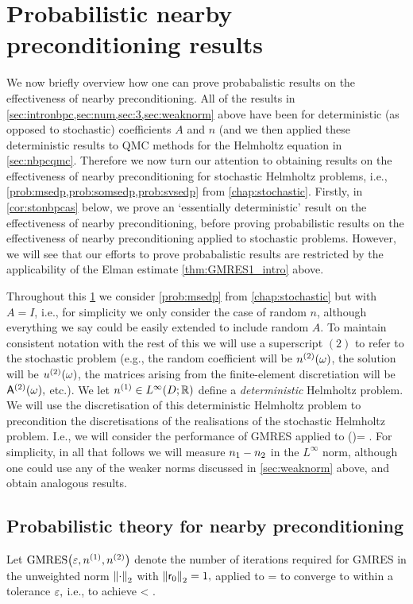 \section{Probabilistic nearby preconditioning results}\label{sec:nbpcstochastic}

We now briefly overview how one can prove probabalistic results on the effectiveness of nearby preconditioning. All of the results in \cref{sec:intronbpc,sec:num,sec:3,sec:weaknorm} above have been for deterministic (as opposed to stochastic) coefficients $A$ and $n$ (and we then applied these deterministic results to QMC methods for the Helmholtz equation in \cref{sec:nbpcqmc}. Therefore we now turn our attention to obtaining results on the effectiveness of nearby preconditioning for stochastic Helmholtz problems, i.e., \cref{prob:msedp,prob:somsedp,prob:svsedp} from \cref{chap:stochastic}. Firstly, in \cref{cor:stonbpcas} below, we prove an `essentially deterministic' result on the effectiveness of nearby preconditioning, before proving probabilistic results on the effectiveness of nearby preconditioning applied to stochastic problems. However, we will see that our efforts to prove probabalistic results are restricted by the applicability of the Elman estimate \cref{thm:GMRES1_intro} above.

Throughout this \cref{sec:nbpcstochastic} we consider \cref{prob:msedp} from \cref{chap:stochastic} but with $A=I$, i.e., for simplicity we only consider the case of random $n$, although everything we say could be easily extended to include random $A$. To maintain consistent notation with the rest of this  we will use a superscript $(2)$ to refer to the stochastic problem (e.g., the random coefficient will be ${n}^{(2)}(\omega)$, the solution will be ${u}^{(2)}(\omega)$, the matrices arising from the finite-element discretiation will be $\mathsf{A}^{(2)}(\omega),$ etc.). We let $\nso \in \LiDRR$ define a \emph{deterministic} Helmholtz problem. We will use the discretisation of this deterministic Helmholtz problem to precondition the discretisations of the realisations of the stochastic Helmholtz problem. I.e., we will consider the performance of GMRES applied to
\beq\label{eq:stopc}
\AmatoI\Amatt(\omega)\uvec = \AmatoI \fvec.
\eeq
For simplicity, in all that follows we will measure $n_{1}-n_{2}$ in the $L^{\infty}$ norm, although one could use any of the weaker norms discussed in \cref{sec:weaknorm} above, and obtain analogous results.

\subsection{Probabilistic theory for nearby preconditioning}
Let $\GMRES{\eps}{\nso}{\nst}$ denote the number of iterations required for GMRES in the unweighted norm $\Nt{\cdot}$ with $\Nt{\rvecz} = 1,$ applied to
\beqs
\AmatoI\Amatt  \uvec = \AmatoI \fvec
\eeqs
to converge to within a tolerance $\varepsilon,$ i.e., to achieve
\beqs
\frac{\Nt{\rvecm}}{\Nt{\fvec}} < \eps.
\eeqs
\ede

